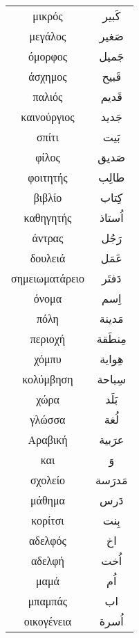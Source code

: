 \documentclass[twocolumn,a4paper]{article}
\newcommand{\ar}[1]{\textarabic{#1}}
\begin{document}
\renewcommand*{\arraystretch}{3}
\begin{supertabular}{ c c }

μικρός      & \ar{ كَبير } \\
μεγάλος     & \ar{ صَغير } \\
όμορφος     & \ar{ جَميل } \\
άσχημος     & \ar{ قَبيح } \\
παλιός      & \ar{ قَديم } \\
καινούργιος & \ar{ جَديد } \\
σπίτι       & \ar{ بَيت } \\
φίλος       & \ar{ صَديق } \\
φοιτητής    & \ar{ طالِب } \\
βιβλίο      & \ar{ كِتاب } \\
καθηγητής   & \ar{ اُستاذ} \\
άντρας      & \ar{ رَجُل } \\
δουλειά     & \ar{ عَمَل } \\
σημειωματάρειο & \ar{ دَفتَر } \\
όνομα       & \ar{اِسم } \\
πόλη        & \ar{ مَدينة } \\
περιοχή     & \ar{ مِنطَقة } \\
χόμπυ       & \ar{ هِواية } \\
κολύμβηση   & \ar{ سِباحة } \\
χώρα        & \ar{ بَلَد } \\
γλώσσα      & \ar{ لُغة } \\
Αραβική     & \ar{ عرَبية } \\
και         & \ar{ وَ } \\
σχολείο     & \ar{ مَدرَسة } \\
μάθημα      & \ar{ دَرس } \\
κορίτσι     & \ar{ بِنت } \\
αδελφός     & \ar{ اخ } \\
αδελφή      & \ar{ اُخت } \\
μαμά        & \ar{ اُم} \\
μπαμπάς     & \ar{ اب } \\
οικογένεια  & \ar{ اُسرة } \\


\end{supertabular}
\end{document}
